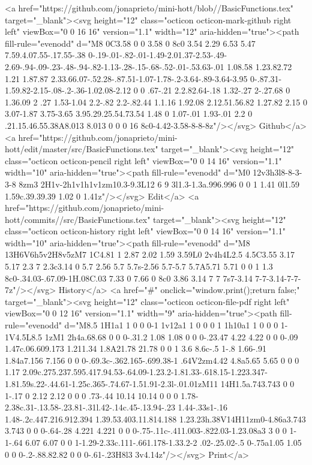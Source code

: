       <a href="https://github.com/jonaprieto/mini-hott/blob//BasicFunctions.tex" target="_blank"><svg height="12" class="octicon octicon-mark-github right left" viewBox="0 0 16 16" version="1.1" width="12" aria-hidden="true"><path fill-rule="evenodd" d="M8 0C3.58 0 0 3.58 0 8c0 3.54 2.29 6.53 5.47 7.59.4.07.55-.17.55-.38 0-.19-.01-.82-.01-1.49-2.01.37-2.53-.49-2.69-.94-.09-.23-.48-.94-.82-1.13-.28-.15-.68-.52-.01-.53.63-.01 1.08.58 1.23.82.72 1.21 1.87.87 2.33.66.07-.52.28-.87.51-1.07-1.78-.2-3.64-.89-3.64-3.95 0-.87.31-1.59.82-2.15-.08-.2-.36-1.02.08-2.12 0 0 .67-.21 2.2.82.64-.18 1.32-.27 2-.27.68 0 1.36.09 2 .27 1.53-1.04 2.2-.82 2.2-.82.44 1.1.16 1.92.08 2.12.51.56.82 1.27.82 2.15 0 3.07-1.87 3.75-3.65 3.95.29.25.54.73.54 1.48 0 1.07-.01 1.93-.01 2.2 0 .21.15.46.55.38A8.013 8.013 0 0 0 16 8c0-4.42-3.58-8-8-8z"/></svg> Github</a>
      <a href="https://github.com/jonaprieto/mini-hott/edit/master/src/BasicFunctions.tex" target="_blank"><svg height="12" class="octicon octicon-pencil right left" viewBox="0 0 14 16" version="1.1" width="10" aria-hidden="true"><path fill-rule="evenodd" d="M0 12v3h3l8-8-3-3-8 8zm3 2H1v-2h1v1h1v1zm10.3-9.3L12 6 9 3l1.3-1.3a.996.996 0 0 1 1.41 0l1.59 1.59c.39.39.39 1.02 0 1.41z"/></svg> Edit</a>
      <a href="https://github.com/jonaprieto/mini-hott/commits//src/BasicFunctions.tex" target="_blank"><svg height="12" class="octicon octicon-history right left" viewBox="0 0 14 16" version="1.1" width="10" aria-hidden="true"><path fill-rule="evenodd" d="M8 13H6V6h5v2H8v5zM7 1C4.81 1 2.87 2.02 1.59 3.59L0 2v4h4L2.5 4.5C3.55 3.17 5.17 2.3 7 2.3c3.14 0 5.7 2.56 5.7 5.7s-2.56 5.7-5.7 5.7A5.71 5.71 0 0 1 1.3 8c0-.34.03-.67.09-1H.08C.03 7.33 0 7.66 0 8c0 3.86 3.14 7 7 7s7-3.14 7-7-3.14-7-7-7z"/></svg> History</a>
      <a  href="#" onclick="window.print();return false;" target="_blank"><svg height="12" class="octicon octicon-file-pdf right left" viewBox="0 0 12 16" version="1.1" width="9" aria-hidden="true"><path fill-rule="evenodd" d="M8.5 1H1a1 1 0 0 0-1 1v12a1 1 0 0 0 1 1h10a1 1 0 0 0 1-1V4.5L8.5 1zM1 2h4a.68.68 0 0 0-.31.2 1.08 1.08 0 0 0-.23.47 4.22 4.22 0 0 0-.09 1.47c.06.609.173 1.211.34 1.8A21.78 21.78 0 0 1 3.6 8.6c-.5 1-.8 1.66-.91 1.84a7.156 7.156 0 0 0-.69.3c-.362.165-.699.38-1 .64V2zm4.42 4.8a5.65 5.65 0 0 0 1.17 2.09c.275.237.595.417.94.53-.64.09-1.23.2-1.81.33-.618.15-1.223.347-1.81.59s.22-.44.61-1.25c.365-.74.67-1.51.91-2.3l-.01.01zM11 14H1.5a.743.743 0 0 1-.17 0 2.12 2.12 0 0 0 .73-.44 10.14 10.14 0 0 0 1.78-2.38c.31-.13.58-.23.81-.31l.42-.14c.45-.13.94-.23 1.44-.33s1-.16 1.48-.2c.447.216.912.394 1.39.53.403.11.814.188 1.23.23h.38V14H11zm0-4.86a3.743 3.743 0 0 0-.64-.28 4.221 4.221 0 0 0-.75-.11c-.411.003-.822.03-1.23.08a3 3 0 0 1-1-.64 6.07 6.07 0 0 1-1.29-2.33c.111-.661.178-1.33.2-2 .02-.25.02-.5 0-.75a1.05 1.05 0 0 0-.2-.88.82.82 0 0 0-.61-.23H8l3 3v4.14z"/></svg> Print</a>
